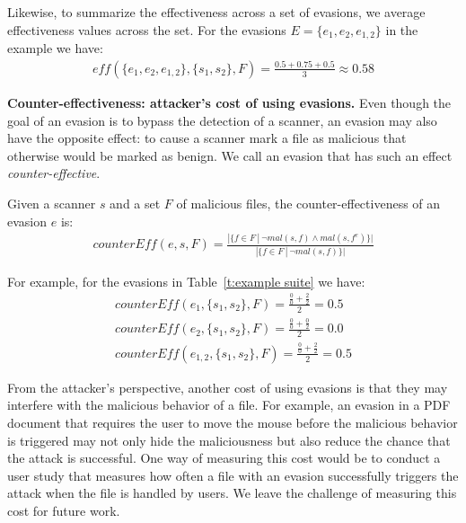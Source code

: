 Likewise, to summarize the effectiveness across a set of evasions, we average effectiveness values across the set. For the evasions $E=\{e_1,e_2,e_{1,2}\}$ in the example we have:
\begin{gather*}
\mathit{eff}(\{e_{1}, e_{2}, e_{1,2}\}, \{s_1, s_2\}, F) = \frac{0.5 + 0.75 + 0.5}{3} \approx 0.58
\end{gather*}


\textbf{Counter-effectiveness: attacker's cost of using evasions.} Even though the goal of an evasion is to bypass the detection of a scanner, an evasion may also have the opposite effect: to cause a scanner mark a
file as malicious that otherwise would be marked as benign.
We call an evasion that has such an effect \emph{counter-effective}.

\begin{definition}
\label{def:counterEff}
Given a scanner $s$ and a set $F$ of malicious files, the counter-effectiveness of an evasion $e$ is:
\begin{multline*}
\mathit{counterEff}(e, s, F) =
\frac
{|\{ f \in F ~|~ \neg \mathit{mal}(s, f) \wedge \mathit{mal}(s, f^e) \}|}
{|\{ f \in F ~|~ \neg \mathit{mal}(s, f) \}|}
\end{multline*}
\end{definition}

For example, for the evasions in Table~\ref{t:example suite} we have:
\begin{gather*}
\mathit{counterEff}(e_1, \{s_1, s_2\}, F) = \frac{\frac{0}{0} + \frac{2}{2}}{2} = 0.5 \\
\mathit{counterEff}(e_2, \{s_1, s_2\}, F) = \frac{\frac{0}{0} + \frac{0}{2}}{2} = 0.0 \\
\mathit{counterEff}(e_{1,2}, \{s_1, s_2\}, F) = \frac{\frac{0}{0} + \frac{2}{2}}{2} = 0.5
\end{gather*}

From the attacker's perspective, another cost of using evasions is that they may interfere with the malicious behavior of a file.
For example, an evasion in a PDF document that requires the user to move the mouse before the malicious behavior is triggered may not only hide the maliciousness but also reduce the chance that the attack is successful.
One way of measuring this cost would be to conduct a user study that measures how often a file with an evasion successfully triggers the attack when the file is handled by users.
We leave the challenge of measuring this cost for future work.


